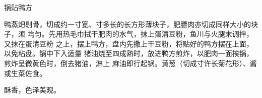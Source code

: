 \begin{recipe}{锅贴鸭方}

\ingredients


\preparation

鸭蒸𤆵剔骨，切成约一寸宽、寸多长的长方形薄块子，肥膘肉亦切成同样大小的块子，须
均匀。先用热毛巾拭干肥肉的水气，抹上蛋清豆粉，鱼川与火腿末调拌，又抹在蛋清豆粉
之上，摆上鸭方，盘内先撒上干豆粉，将贴好的鸭方摆在上面，以免粘盘。锅中下入适量
猪油烧至四成熟时，放进鸭方煎炸，以肥肉一面挨锅，煎炸呈微黄色时，倒去猪油，淋上
麻油即行起锅。黄葱（切成寸许长菊花形）、酱或生菜佐食。

\features

酥香，色泽美观。

\end{recipe}

